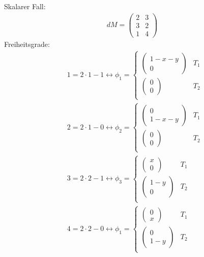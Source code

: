 \begin{beispiel}
Skalarer Fall:
\begin{align*}
  dM =
  \begin{pmatrix}
    2 & 3 \\
    3 & 2\\
    1 & 4
  \end{pmatrix}
\end{align*}
Freiheitsgrade: 
\begin{align*}
&  1 = 2 \cdot 1 - 1 \leftrightarrow \phi_1 =
  \begin{cases}
    \begin{pmatrix}
      1-x-y\\ 0
    \end{pmatrix} & T_1\\
    \begin{pmatrix}
      0\\ 0
    \end{pmatrix} & T_2\\
  \end{cases}\\
 & 2 = 2 \cdot 1 - 0 \leftrightarrow \phi_2 =
  \begin{cases}
    \begin{pmatrix}
      0\\1-x-y
    \end{pmatrix} & T_1\\
    \begin{pmatrix}
      0\\ 0
    \end{pmatrix} & T_2\\
  \end{cases}\\
 & 3 = 2 \cdot 2 - 1 \leftrightarrow \phi_3 =
  \begin{cases}
    \begin{pmatrix}
      x\\ 0
    \end{pmatrix} & T_1\\
    \begin{pmatrix}
      1-y\\ 0
    \end{pmatrix} & T_2\\
  \end{cases}\\
&  4 = 2 \cdot 2 - 0 \leftrightarrow \phi_1 =
  \begin{cases}
    \begin{pmatrix}
      0\\x
    \end{pmatrix} & T_1\\
    \begin{pmatrix}
      0\\ 1-y
    \end{pmatrix} & T_2\\
  \end{cases}
\end{align*}

\end{beispiel}
